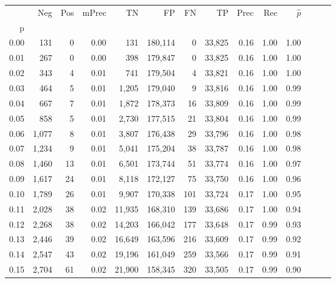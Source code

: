 \begin{tabular}{rrrrrrrrrrrrrr}
\toprule
{} &    Neg &  Pos & mPrec &       TN &       FP &      FN &      TP &  Prec &   Rec & $\hat{p}$ \\
p    &        &      &       &          &          &         &         &       &       &           \\
\midrule
0.00 &    131 &    0 &  0.00 &      131 &  180,114 &       0 &  33,825 &  0.16 &  1.00 &      1.00 \\
0.01 &    267 &    0 &  0.00 &      398 &  179,847 &       0 &  33,825 &  0.16 &  1.00 &      1.00 \\
0.02 &    343 &    4 &  0.01 &      741 &  179,504 &       4 &  33,821 &  0.16 &  1.00 &      1.00 \\
0.03 &    464 &    5 &  0.01 &    1,205 &  179,040 &       9 &  33,816 &  0.16 &  1.00 &      0.99 \\
0.04 &    667 &    7 &  0.01 &    1,872 &  178,373 &      16 &  33,809 &  0.16 &  1.00 &      0.99 \\
0.05 &    858 &    5 &  0.01 &    2,730 &  177,515 &      21 &  33,804 &  0.16 &  1.00 &      0.99 \\
0.06 &  1,077 &    8 &  0.01 &    3,807 &  176,438 &      29 &  33,796 &  0.16 &  1.00 &      0.98 \\
0.07 &  1,234 &    9 &  0.01 &    5,041 &  175,204 &      38 &  33,787 &  0.16 &  1.00 &      0.98 \\
0.08 &  1,460 &   13 &  0.01 &    6,501 &  173,744 &      51 &  33,774 &  0.16 &  1.00 &      0.97 \\
0.09 &  1,617 &   24 &  0.01 &    8,118 &  172,127 &      75 &  33,750 &  0.16 &  1.00 &      0.96 \\
0.10 &  1,789 &   26 &  0.01 &    9,907 &  170,338 &     101 &  33,724 &  0.17 &  1.00 &      0.95 \\
0.11 &  2,028 &   38 &  0.02 &   11,935 &  168,310 &     139 &  33,686 &  0.17 &  1.00 &      0.94 \\
0.12 &  2,268 &   38 &  0.02 &   14,203 &  166,042 &     177 &  33,648 &  0.17 &  0.99 &      0.93 \\
0.13 &  2,446 &   39 &  0.02 &   16,649 &  163,596 &     216 &  33,609 &  0.17 &  0.99 &      0.92 \\
0.14 &  2,547 &   43 &  0.02 &   19,196 &  161,049 &     259 &  33,566 &  0.17 &  0.99 &      0.91 \\
0.15 &  2,704 &   61 &  0.02 &   21,900 &  158,345 &     320 &  33,505 &  0.17 &  0.99 &      0.90 \\

\end{tabular}
